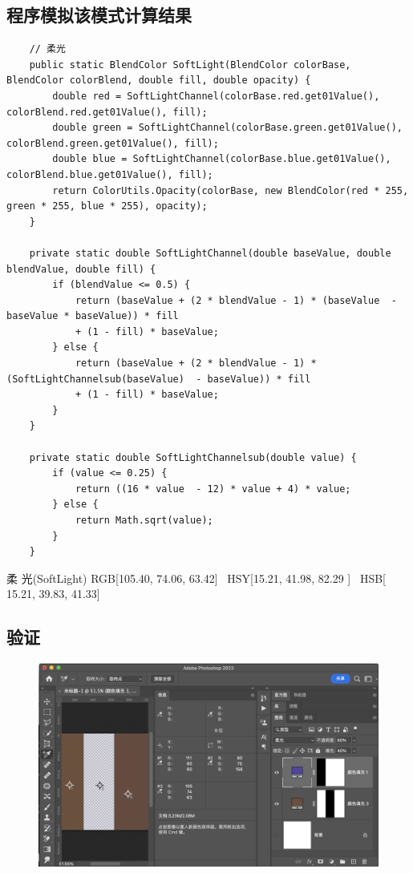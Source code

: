 \subsection{ 程序模拟该模式计算结果}

\begin{lstlisting}
	// 柔光
	public static BlendColor SoftLight(BlendColor colorBase, BlendColor colorBlend, double fill, double opacity) {
		double red = SoftLightChannel(colorBase.red.get01Value(), colorBlend.red.get01Value(), fill);
		double green = SoftLightChannel(colorBase.green.get01Value(), colorBlend.green.get01Value(), fill);
		double blue = SoftLightChannel(colorBase.blue.get01Value(), colorBlend.blue.get01Value(), fill);
		return ColorUtils.Opacity(colorBase, new BlendColor(red * 255, green * 255, blue * 255), opacity);
	}
	
	private static double SoftLightChannel(double baseValue, double blendValue, double fill) {
		if (blendValue <= 0.5) {
			return (baseValue + (2 * blendValue - 1) * (baseValue  -baseValue * baseValue)) * fill
			+ (1 - fill) * baseValue;
		} else {
			return (baseValue + (2 * blendValue - 1) * (SoftLightChannelsub(baseValue)  - baseValue)) * fill
			+ (1 - fill) * baseValue;
		}
	}
	
	private static double SoftLightChannelsub(double value) {
		if (value <= 0.25) {
			return ((16 * value  - 12) * value + 4) * value;
		} else {
			return Math.sqrt(value);
		}
	}
\end{lstlisting}



\begin{result}
\item 柔    光(SoftLight)     RGB[105.40,  74.06,  63.42]~ HSY[15.21,  41.98,  82.29 ]~ HSB[ 15.21,  39.83,  41.33]
\end{result}

\subsection{ 验证}
\begin{figure}[h!]
	\centering
	\includegraphics[width=\linewidth]{figure/softlight}
	\caption{}
	\label{fig:softlight}
\end{figure}


